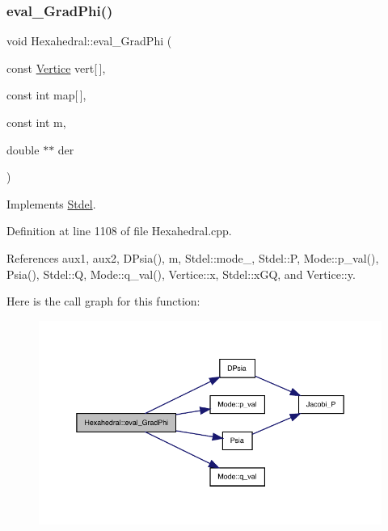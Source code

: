 \subsubsection{\texorpdfstring{eval\+\_\+\+Grad\+Phi()}{eval\_GradPhi()}}
{\footnotesize\ttfamily void Hexahedral\+::eval\+\_\+\+Grad\+Phi (\begin{DoxyParamCaption}\item[{const \hyperlink{structVertice}{Vertice}}]{vert\mbox{[}$\,$\mbox{]},  }\item[{const int}]{map\mbox{[}$\,$\mbox{]},  }\item[{const int}]{m,  }\item[{double $\ast$$\ast$}]{der }\end{DoxyParamCaption})\hspace{0.3cm}{\ttfamily [virtual]}}



Implements \hyperlink{classStdel_a83a7a53e4be6da7c3a615967e4504b07}{Stdel}.



Definition at line 1108 of file Hexahedral.\+cpp.



References aux1, aux2, D\+Psia(), m, Stdel\+::mode\+\_\+, Stdel\+::P, Mode\+::p\+\_\+val(), Psia(), Stdel\+::Q, Mode\+::q\+\_\+val(), Vertice\+::x, Stdel\+::x\+GQ, and Vertice\+::y.

Here is the call graph for this function\+:
\nopagebreak
\begin{figure}[H]
\begin{center}
\leavevmode
\includegraphics[width=350pt]{classHexahedral_a74909a28bef5ee2b4de02d571061fed8_cgraph}
\end{center}
\end{figure}
\mbox{\label{classHexahedral_ae26647440a5b8a60d0f7075435acfe44}} 
